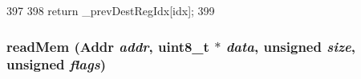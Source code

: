 \begin{DoxyCode}
397     {
398         return _prevDestRegIdx[idx];
399     }
\end{DoxyCode}
\hypertarget{classBaseDynInst_a66191b2d8a45050b7df3c3efa7bb07c6}{
\subsubsection[{readMem}]{ readMem ({\bf Addr} {\em addr}, \/  uint8\_\-t $\ast$ {\em data}, \/  unsigned {\em size}, \/  unsigned {\em flags})}}
\label{classBaseDynInst_a66191b2d8a45050b7df3c3efa7bb07c6}



